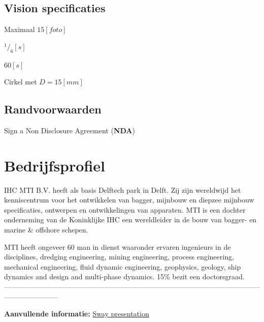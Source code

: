 \documentclass[a4paper,11pt]{../LatexDocStructures/MTItexMemo} %
\begin{document}
\subsection{Vision specificaties}
\begin{description}
	\setlength{\itemsep}{0cm}
	\setlength{\parskip}{0cm}
	\item[\textbf{Aantal}] Maximaal $ 15 [foto] $
	\item[\textbf{Belichtingstijd}] $ ^1/_6 [s] $
	\item[\textbf{Totale procestijd}] $ 60 [s] $
	\item[\textbf{Werkgebied}] Cirkel met $ D = 15 [mm] $
\end{description}

\subsection{Randvoorwaarden}
\begin{description}
	\setlength{\itemsep}{0cm}
	\setlength{\parskip}{0cm}
	\item Sign a Non Disclosure Agreement (\textbf{NDA})
\end{description}

\section{Bedrijfsprofiel}
IHC MTI B.V. heeft als basis Delftech park in Delft. Zij zijn wereldwijd het kenniscentrum voor het ontwikkelen van bagger, mijnbouw en diepzee mijnbouw specificaties, ontwerpen en ontwikkelingen van apparaten. MTI is een dochter onderneming van de Koninklijke IHC een wereldleider in de bouw van bagger- en marine \& offshore schepen.

MTI heeft ongeveer 60 man in dienst waaronder ervaren ingenieurs in de disciplines, dredging engineering, mining engineering, process engineering, mechanical engineering, fluid dynamic engineering, geophysics, geology, ship dynamics and design and multi-phase dynamics. 15\% bezit een doctorsgraad.\\
-----------------------------------------------------------------------------------------------------------------------------------

\noindent \textbf{Aanvullende informatie:} \href{https://sway.com/iI7d7AZ0BlfC2fIf}{Sway presentation}
\end{document}
